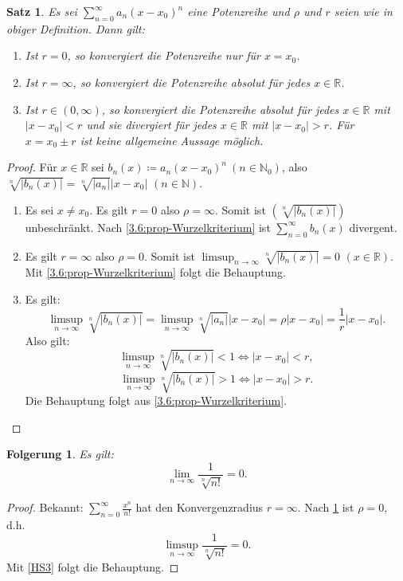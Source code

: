 \documentclass[12pt]{extreport} %
\newcommand{\N}{\mathbb{N}}
\newcommand{\R}{\mathbb{R}}
\theoremstyle{named}
\theoremstyle{itshape}
\newtheorem{satz}[unnamedtheorem]{Satz}
\theoremstyle{normal}
\newtheorem*{folgerung*}{Folgerung}
\begin{document}
\begin{satz} \label{4.1:satz}
	Es sei $\sum_{n=0}^{\infty} a_{n} (x - x_{0})^{n}$ eine Potenzreihe und $\rho$ und $r$ seien wie in obiger Definition. Dann gilt:
	\begin{enumerate}
		\item Ist $r = 0$, so konvergiert die Potenzreihe nur für $x = x_{0}$.
		\item Ist $r = \infty$, so konvergiert die Potenzreihe absolut für jedes $x \in \R$.
		\item Ist $r \in (0, \infty)$, so konvergiert die Potenzreihe absolut für jedes $x \in \R$ mit $|x - x_{0}| < r$ und sie divergiert für jedes $x \in \R$ mit 
		 $|x - x_{0}| > r$. Für $x = x_{0} \pm r$ ist keine allgemeine Aussage möglich.
	\end{enumerate}
\end{satz}

\begin{proof}
	Für $x \in \R$ sei $b_{n}(x) \coloneqq a_{n} (x - x_{0})^{n} ~(n \in \N_{0})$, also $\sqrt[n]{|b_{n}(x)|} = \sqrt[n]{|a_{n}|} |x - x_{0}|$ $(n \in \N)$.
	\begin{enumerate}
		\item Es sei $x \neq x_{0}$. Es gilt $r = 0$ also $\rho = \infty$. Somit ist $\left( \sqrt[n]{|b_{n}(x)|} \right)$ unbeschränkt. 
		      Nach \ref{3.6:prop-Wurzelkriterium} ist $\sum_{n=0}^{\infty} b_{n}(x)$ divergent.
		\item Es gilt $r = \infty$ also $\rho = 0$. Somit ist $\limsup_{n \to \infty} \sqrt[n]{|b_{n}(x)|} = 0$ $(x \in \R)$. Mit \ref{3.6:prop-Wurzelkriterium}
		      folgt die Behauptung.
		\item Es gilt:
		        $$\limsup_{n \to \infty} \sqrt[n]{|b_{n}(x)|} = \limsup_{n \to \infty} \sqrt[n]{|a_{n}|} |x - x_{0}| = \rho |x - x_{0}| = \frac{1}{r} |x - x_{0}|.$$
		        Also gilt:
			$$\limsup_{n \to \infty} \sqrt[n]{|b_{n}(x)|} < 1 \iff |x - x_0| < r,$$
			$$\limsup_{n \to \infty} \sqrt[n]{|b_{n}(x)|} > 1 \iff |x - x_0| > r.$$
			Die Behauptung folgt aus \ref{3.6:prop-Wurzelkriterium}.
	\end{enumerate}	
\end{proof}


\begin{folgerung*}
        Es gilt:
	$$\lim_{n \rightarrow \infty} \frac{1}{\sqrt[n]{n!}} = 0.$$	
\end{folgerung*}

\begin{proof}
	Bekannt: $\sum_{n=0}^{\infty} \frac{x^{n}}{n!}$ hat den Konvergenzradius $r = \infty$. Nach \ref{4.1:satz} ist $\rho = 0$, d.h. 
	$$ \limsup_{n \to \infty} \frac{1}{\sqrt[n]{n!}} = 0. $$
	Mit \ref{HS3} folgt die Behauptung.
\end{proof}
\end{document}
